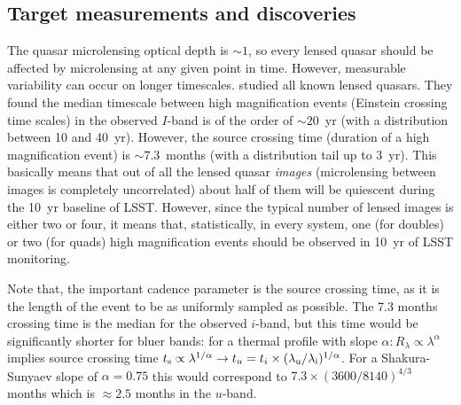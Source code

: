 
\subsection{Target measurements and discoveries}
\label{sec:keyword:targets}





The quasar microlensing optical depth is $\sim1$, so every lensed
quasar should be affected by microlensing at any given point in time.
However, measurable variability can occur on longer timescales.
\citet{MosqueraandKochanek2011} studied all known lensed quasars.
They found the median timescale between high magnification events
(Einstein crossing time scales) in the observed $I$-band is of the
order of $\sim20$~yr (with a distribution between 10 and 40~yr).
However, the source crossing time (duration of a high magnification
event) is $\sim7.3$~months (with a distribution tail up to 3~yr).
This basically means that out of all the lensed quasar {\em images}
(microlensing between images is completely uncorrelated) about half
of them will be quiescent during the 10~yr baseline of LSST. However,
since the typical number of lensed images is either two or four, it
means that, statistically, in every system, one (for doubles) or two
(for quads) high magnification events should be observed in 10~yr of
LSST monitoring.

Note that, the important cadence parameter is the source crossing time,
as it is the length of the event to be as uniformly sampled as
possible. The 7.3 months crossing time is the median for the observed
$i$-band, but this time would be significantly shorter for bluer bands:
for a thermal profile with slope
$\alpha: R_\lambda \propto \lambda^\alpha$ implies source crossing time
$t_{\rm s} \propto \lambda^{1/\alpha} \rightarrow
t_u=t_i \times (\lambda_{\rm u} / \lambda_{\rm i})^{1/\alpha}$. For a
Shakura-Sunyaev slope of $\alpha=0.75$ this would correspond to
$7.3 \times (3600/8140)^{4/3}$ months which is $\approx 2.5$ months in
the $u$-band.


